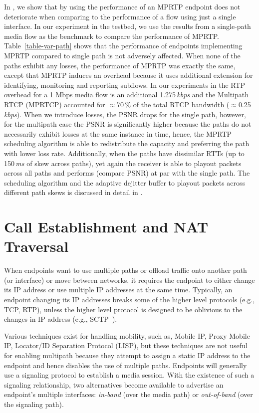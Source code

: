 In , we show that by using the performance of an MPRTP
endpoint does not deteriorate when comparing to the performance of a flow
using just a single interface. In our experiment in the testbed, we use the
results from a single-path media flow as the benchmark to compare the
performance of MPRTP. Table~\ref{table-var-path} shows that the performance of
endpoints implementing MPRTP compared to single path is not adversely
affected. When none of the paths exhibit any losses, the performance of MPRTP
was exactly the same, except that MPRTP induces an overhead because it uses
additional extension for identifying, monitoring and reporting subflows. In
our experiments in  the RTP overhead for a 1 Mbps media flow
is an additional 1.275\,\emph{kbps} and the Multipath RTCP (MPRTCP) accounted
for $\approx$70\,\% of the total RTCP bandwidth ($\approx$0.25\,\emph{kbps}).
When we introduce losses, the PSNR drops for the single path, however, for the
multipath case the PSNR is significantly higher because the paths do not
necessarily exhibit losses at the same instance in time, hence, the MPRTP
scheduling algorithm is able to redistribute the capacity and preferring the
path with lower loss rate. Additionally, when the paths have dissimilar RTTs
(up to 150\,\emph{ms} of skew across paths), yet again the receiver is able to
playout packets across all paths and performs (compare PSNR) at par with the
single path. The scheduling algorithm and the adaptive dejitter buffer to
playout packets across different path skews is discussed in detail in
.


\section{Call Establishment and NAT Traversal}

When endpoints want to use multiple paths or offload traffic onto another path
(or interface) or move between networks, it requires the endpoint to either
change its IP address or use multiple IP addresses at the same time.
Typically, an endpoint changing its IP addresses breaks some of the higher
level protocols (e.g., TCP, RTP), unless the higher level protocol is designed
to be oblivious to the changes in IP address (e.g., SCTP~\cite{rfc4960}).

Various techniques exist for handling mobility, such as, Mobile IP, Proxy
Mobile IP, Locator/ID Separation Protocol (LISP), but these techniques are not
useful for enabling multipath because they attempt to assign a static IP
address to the endpoint and hence disables the use of multiple paths.
Endpoints will generally use a signaling protocol to establish a media
session. With the existence of such a signaling relationship, two alternatives
become available to advertise an endpoint's multiple interfaces:
\emph{in-band} (over the media path) or \emph{out-of-band} (over the signaling
path).

